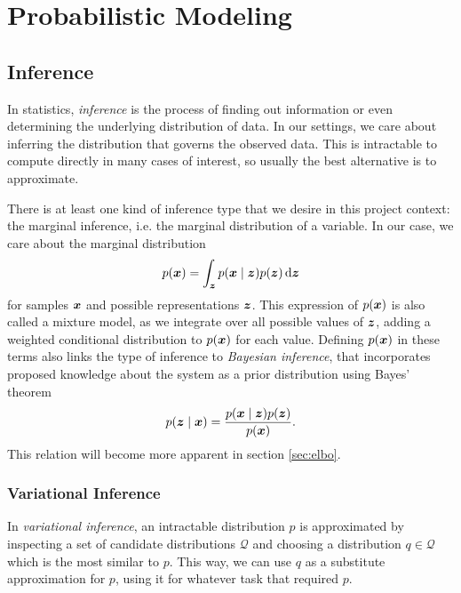 \chapter{Probabilistic Modeling}
\label{chapter:probabilistic_modeling}


\section{Inference}
In statistics, \textit{inference} is the process of finding out information or even determining the underlying distribution of data. In our settings, we care about inferring the distribution that governs the observed data. This is intractable to compute directly in many cases of interest, so usually the best alternative is to approximate.

There is at least one kind of inference type that we desire in this project context: the marginal inference, i.e. the marginal distribution of a variable. In our case, we care about the marginal distribution 
\begin{equation}
    p(\bm{ x }) = \int_{\bm{ z }} p(\bm{ x } \mid \bm{ z }) p(\bm{ z }) \mathop{}\!\mathrm{d} \bm{ z } \label{eq:marginal_distribution}
\end{equation}
for samples $\bm{ x }$ and possible representations $\bm{ z }$. This expression of $p(\bm{ x })$ is also called a mixture model, as we integrate over all possible values of $\bm{ z }$, adding a weighted conditional distribution to $p(\bm{ x })$ for each value. Defining $p(\bm{ x })$ in these terms also links the type of inference to \textit{Bayesian inference}, that incorporates proposed knowledge about the system as a prior distribution using Bayes' theorem
\begin{equation}
    p(\bm{ z } \mid \bm{ x }) = \frac{p(\bm{ x } \mid \bm{ z }) p(\bm{ z })}{p(\bm{ x })}. \label{eq:bayes_theorem}
\end{equation}
This relation will become more apparent in section \ref{sec:elbo}.

\subsection{Variational Inference}
\label{sec:variational_inference}
In \textit{variational inference}, an intractable distribution $p$ is approximated by inspecting a set of candidate distributions $\mathcal{Q}$ and choosing a distribution $q \in \mathcal{Q}$ which is the most similar to $p$. This way, we can use $q$ as a substitute approximation for $p$, using it for whatever task that required $p$.

